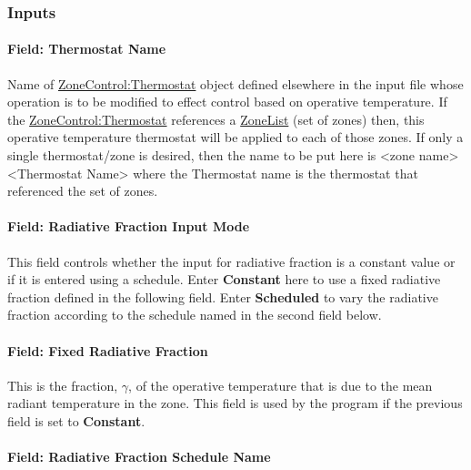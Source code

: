 \subsubsection{Inputs}\label{inputs-5-034}

\paragraph{Field: Thermostat Name}\label{field-thermostat-name-000}

Name of \hyperref[zonecontrolthermostat]{ZoneControl:Thermostat} object defined elsewhere in the input file whose operation is to be modified to effect control based on operative temperature. If the \hyperref[zonecontrolthermostat]{ZoneControl:Thermostat} references a \hyperref[zonelist]{ZoneList} (set of zones) then, this operative temperature thermostat will be applied to each of those zones. If only a single thermostat/zone is desired, then the name to be put here is \textless{}zone name\textgreater{} \textless{}Thermostat Name\textgreater{} where the Thermostat name is the thermostat that referenced the set of zones.

\paragraph{Field: Radiative Fraction Input Mode}\label{field-radiative-fraction-input-mode}

This field controls whether the input for radiative fraction is a constant value or if it is entered using a schedule. Enter \textbf{Constant} here to use a fixed radiative fraction defined in the following field. Enter \textbf{Scheduled} to vary the radiative fraction according to the schedule named in the second field below.

\paragraph{Field: Fixed Radiative Fraction}\label{field-fixed-radiative-fraction}

This is the fraction, \(\gamma\), of the operative temperature that is due to the mean radiant temperature in the zone. This field is used by the program if the previous field is set to \textbf{Constant}.

\paragraph{Field: Radiative Fraction Schedule Name}\label{field-radiative-fraction-schedule-name}

